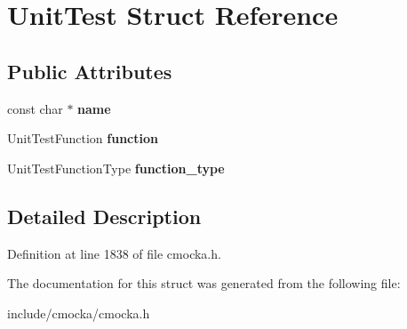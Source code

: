 \hypertarget{structUnitTest}{}\section{Unit\+Test Struct Reference}
\label{structUnitTest}
\subsection*{Public Attributes}
\begin{DoxyCompactItemize}
\item 
\mbox{\label{structUnitTest_abdb6119bbcda2106f1a47a76a80aac16}} 
const char $\ast$ {\bfseries name}
\item 
\mbox{\label{structUnitTest_ab2683504dd77ec4b245424b8629bec53}} 
Unit\+Test\+Function {\bfseries function}
\item 
\mbox{\label{structUnitTest_a07743df4563f54b325b3fff4859c502c}} 
Unit\+Test\+Function\+Type {\bfseries function\+\_\+type}
\end{DoxyCompactItemize}


\subsection{Detailed Description}


Definition at line 1838 of file cmocka.\+h.



The documentation for this struct was generated from the following file\+:\begin{DoxyCompactItemize}
\item 
include/cmocka/cmocka.\+h\end{DoxyCompactItemize}
